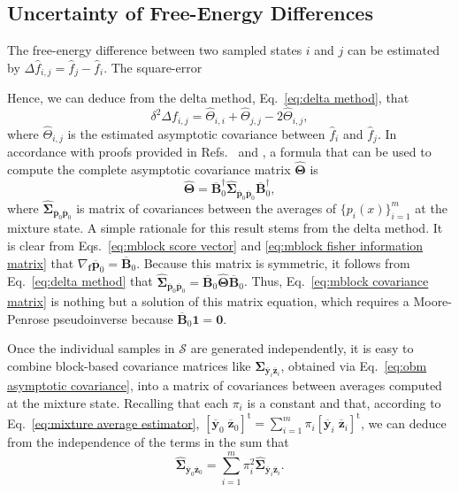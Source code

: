 \documentclass[aip,jcp,reprint,amsmath,amssymb]{revtex4-1}
\newcommand{\mt}[1]{\boldsymbol{\mathbf{#1}}}           %
\newcommand{\vt}[1]{\boldsymbol{\mathbf{#1}}}           %
\newcommand{\tr}[1]{#1^\text{t}}                        %
\begin{document}
\subsection{Uncertainty of Free-Energy Differences}

The free-energy difference between two sampled states $i$ and $j$ can be estimated by $\Delta \hat f_{i,j} = \hat f_j - \hat f_i$. The square-error 

Hence, we can deduce from the delta method, Eq.~\eqref{eq:delta method}, that
\begin{equation}
\delta^2 \Delta f_{i,j} = \hat \Theta_{i,i} + \hat \Theta_{j,j} - 2\hat \Theta_{i,j},
\end{equation}
where $\hat \Theta_{i,j}$ is the estimated asymptotic covariance between $\hat f_i$ and $\hat f_j$. In accordance with proofs provided in Refs.~ and , a formula that can be used to compute the complete asymptotic covariance matrix $\hat{\mt \Theta}$ is
\begin{equation}
\label{eq:mblock covariance matrix}
\hat{\mt \Theta} = \overline{\mt B}_0^\dag \hat{\mt \Sigma}_{\overline{\vt p}_0 \overline{\vt p}_0} \overline{\mt B}_0^\dag,
\end{equation}
where $\hat{\mt \Sigma}_{\overline{\vt p}_0 \overline{\vt p}_0}$ is matrix of covariances between the averages of $\{p_i(x)\}_{i=1}^m$ at the mixture state. A simple rationale for this result stems from the delta method. It is clear from Eqs.~\eqref{eq:mblock score vector} and \eqref{eq:mblock fisher information matrix} that $\nabla_{\vt f}\overline{\vt p}_0 = \overline{\mt B}_0$. Because this matrix is symmetric, it follows from Eq.~\eqref{eq:delta method} that $\hat{\mt \Sigma}_{\overline{\vt p}_0 \overline{\vt p}_0} = \overline{\mt B}_0 \hat{\mt \Theta} \overline{\mt B}_0$. Thus, Eq.~\eqref{eq:mblock covariance matrix} is nothing but a solution of this matrix equation, which requires a Moore-Penrose pseudoinverse because $\overline{\mt B}_0 \vt 1 = \vt 0$.

Once the individual samples in $\mathcal S$ are generated independently, it is easy to combine block-based covariance matrices like $\hat{\mt \Sigma}_{\overline{\vt y}_i \overline{\vt z}_i}$, obtained via Eq.~\eqref{eq:obm asymptotic covariance}, into a matrix of covariances between averages computed at the mixture state. Recalling that each $\pi_i$ is a constant and that, according to Eq.~\eqref{eq:mixture average estimator}, $\tr{[\overline{\vt y}_0 \; \overline{\vt z}_0]} = \sum_{i=1}^m \pi_i \tr{[\overline{\vt y}_i \; \overline{\vt z}_i]}$, we can deduce from the independence of the terms in the sum that
\begin{equation}
\hat{\mt \Sigma}_{\overline{\vt y}_0 \overline{\vt z}_0} = \sum_{i=1}^m \pi_i^2 \hat{\mt \Sigma}_{\overline{\vt y}_i \overline{\vt z}_i}.
\end{equation}
\end{document}
